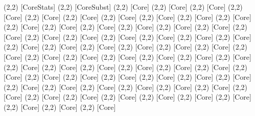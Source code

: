 {(2,2) [CoreStats] %
(2,2) [CoreSubst] %
(2,2) [Core] %
(2,2) [Core] %
(2,2) [Core] %
(2,2) [Core] %
(2,2) [Core] %
(2,2) [Core] %
(2,2) [Core] %
(2,2) [Core] %
(2,2) [Core] %
(2,2) [Core] %
(2,2) [Core] %
(2,2) [Core] %
(2,2) [Core] %
(2,2) [Core] %
(2,2) [Core] %
(2,2) [Core] %
(2,2) [Core] %
(2,2) [Core] %
(2,2) [Core] %
(2,2) [Core] %
(2,2) [Core] %
(2,2) [Core] %
(2,2) [Core] %
(2,2) [Core] %
(2,2) [Core] %
(2,2) [Core] %
(2,2) [Core] %
(2,2) [Core] %
(2,2) [Core] %
(2,2) [Core] %
(2,2) [Core] %
(2,2) [Core] %
(2,2) [Core] %
(2,2) [Core] %
(2,2) [Core] %
(2,2) [Core] %
(2,2) [Core] %
(2,2) [Core] %
(2,2) [Core] %
(2,2) [Core] %
(2,2) [Core] %
(2,2) [Core] %
(2,2) [Core] %
(2,2) [Core] %
(2,2) [Core] %
(2,2) [Core] %
(2,2) [Core] %
(2,2) [Core] %
(2,2) [Core] %
(2,2) [Core] %
(2,2) [Core] %
(2,2) [Core] %
(2,2) [Core] %
(2,2) [Core] %
(2,2) [Core] %
(2,2) [Core] %
(2,2) [Core] %
(2,2) [Core] %
(2,2) [Core] %
(2,2) [Core] %
(2,2) [Core] %
(2,2) [Core] %
(2,2) [Core] %
(2,2) [Core] %
(2,2) [Core] %
}
